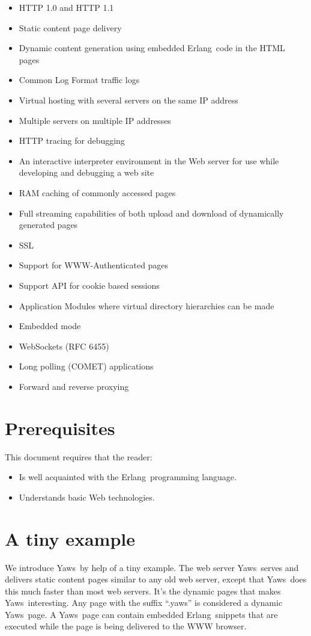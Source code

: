 \documentclass[11pt,oneside,english]{book}
\newcommand{\Erlang}            %
        {{\sc Erlang}}
\newcommand{\Yaws}            %
        {{\sc Yaws}}
\begin{document}
\begin{itemize}
\item HTTP 1.0 and HTTP 1.1
\item Static content page delivery
\item Dynamic content generation using embedded \Erlang\  code in the
HTML pages
\item Common Log Format traffic logs
\item Virtual hosting with several servers on the same IP address
\item Multiple servers on multiple IP addresses
\item HTTP tracing for debugging
\item An interactive interpreter environment in the Web server for use while
developing and debugging a web site
\item RAM caching of commonly accessed pages
\item Full streaming capabilities of both upload and download of dynamically
generated pages
\item SSL
\item Support for WWW-Authenticated pages
\item Support API for cookie based sessions
\item Application Modules where virtual directory hierarchies can
be made
\item Embedded mode
\item WebSockets (RFC 6455)
\item Long polling (COMET) applications
\item Forward and reverse proxying
\end{itemize}

\section{Prerequisites}
This document requires that the reader:
\begin{itemize}
\item Is well acquainted with the \Erlang\  programming language.
\item Understands basic Web technologies.
\end{itemize}


\section{A tiny example}

We introduce \Yaws\  by help of a tiny example.
 The web server \Yaws\  serves  and delivers
static content pages similar to any old web server, except that \Yaws\  does this
much faster than most web servers. It's the dynamic pages
that makes \Yaws\  interesting. Any page with the suffix ``.yaws'' is considered
a dynamic \Yaws\  page. A \Yaws\  page can contain embedded \Erlang\  snippets that
are executed while the page is being delivered to the WWW browser.
\end{document}
